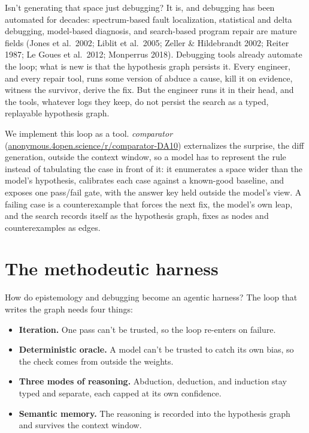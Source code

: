 \documentclass[
  10pt,
]{article}
\providecommand{\tightlist}{%
  \setlength{\itemsep}{0pt}\setlength{\parskip}{0pt}}
\begin{document}
Isn't generating that space just debugging? It is, and debugging has
been automated for decades: spectrum-based fault localization,
statistical and delta debugging, model-based diagnosis, and search-based
program repair are mature fields (Jones et al.~2002; Liblit et al.~2005;
Zeller \& Hildebrandt 2002; Reiter 1987; Le Goues et al.~2012; Monperrus
2018). Debugging tools already automate the loop; what is new is that
the hypothesis graph persists it. Every engineer, and every repair tool,
runs some version of abduce a cause, kill it on evidence, witness the
survivor, derive the fix. But the engineer runs it in their head, and
the tools, whatever logs they keep, do not persist the search as a
typed, replayable hypothesis graph.

We implement this loop as a tool. \emph{comparator}
(\href{https://anonymous.4open.science/r/comparator-DA10}{anonymous.4open.science/r/comparator-DA10})
externalizes the surprise, the diff generation, outside the context
window, so a model has to represent the rule instead of tabulating the
case in front of it: it enumerates a space wider than the model's
hypothesis, calibrates each case against a known-good baseline, and
exposes one pass/fail gate, with the answer key held outside the model's
view. A failing case is a counterexample that forces the next fix, the
model's own leap, and the search records itself as the hypothesis graph,
fixes as nodes and counterexamples as edges.

\section{The methodeutic harness}\label{method}

How do epistemology and debugging become an agentic harness? The loop
that writes the graph needs four things:

\begin{itemize}
\tightlist
\item
  \textbf{Iteration.} One pass can't be trusted, so the loop re-enters
  on failure.
\item
  \textbf{Deterministic oracle.} A model can't be trusted to catch its
  own bias, so the check comes from outside the weights.
\item
  \textbf{Three modes of reasoning.} Abduction, deduction, and induction
  stay typed and separate, each capped at its own confidence.
\item
  \textbf{Semantic memory.} The reasoning is recorded into the
  hypothesis graph and survives the context window.
\end{itemize}
\end{document}
